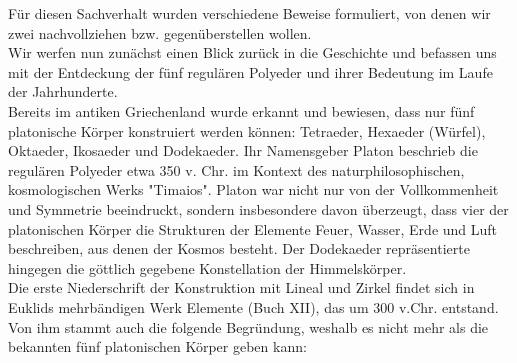 Für diesen Sachverhalt wurden verschiedene Beweise formuliert, von denen wir zwei nachvollziehen bzw. gegenüberstellen wollen. \\
Wir werfen nun zunächst einen Blick zurück in die Geschichte und befassen uns mit der Entdeckung der fünf regulären Polyeder und ihrer Bedeutung im Laufe der Jahrhunderte. \\
Bereits im antiken Griechenland wurde erkannt und bewiesen, dass nur fünf platonische Körper konstruiert werden können: Tetraeder, Hexaeder (Würfel), Oktaeder, Ikosaeder und Dodekaeder. Ihr Namensgeber Platon beschrieb die regulären Polyeder etwa 350 v. Chr. im Kontext des naturphilosophischen, kosmologischen Werks "Timaios". Platon war nicht nur von der Vollkommenheit und Symmetrie beeindruckt, sondern insbesondere davon überzeugt, dass vier der platonischen Körper die Strukturen der Elemente Feuer, Wasser, Erde und Luft beschreiben, aus denen der Kosmos besteht. Der Dodekaeder repräsentierte hingegen die göttlich gegebene Konstellation der Himmelskörper.\\
Die erste Niederschrift der Konstruktion mit Lineal und Zirkel findet sich in Euklids mehrbändigen Werk Elemente (Buch XII), das um 300 v.Chr. entstand. Von ihm stammt auch die folgende Begründung, weshalb es nicht mehr als die bekannten fünf platonischen Körper geben kann:
